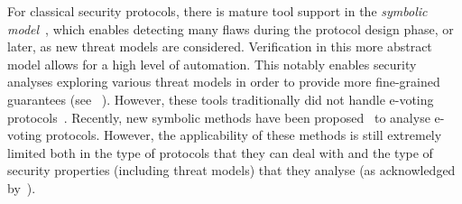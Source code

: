 For classical security protocols, there is mature tool
support in the {\em symbolic model}~\cite{Tamarin,avantssar-tacas12,BlanchetCSFW01,Cr2008Scyther},
which enables detecting many
flaws during the protocol design phase, or later, as new threat models are
considered.
Verification in this more abstract model allows for a high level of automation.
This notably enables security analyses exploring various threat models in order to provide
more fine-grained guarantees (see \eg~\cite{basin2014know,basin2018formal,bhargavan2017verified}).
However, these tools traditionally did not handle e-voting
protocols~\cite{surveyJLAMP16}.
Recently, new symbolic methods have been proposed~\cite{vote-CSF08-maffei,vote-CSF16,vote-ESO16,dreier2017beyond,cortier2017type}
to analyse e-voting protocols. 
However, the applicability of these methods is still extremely limited
both in the type of protocols that they can deal with and the type of security
properties (including threat models) that they analyse (as acknowledged by~\cite{vote-ijcar,vote-ESO16,surveyJLAMP16}).

